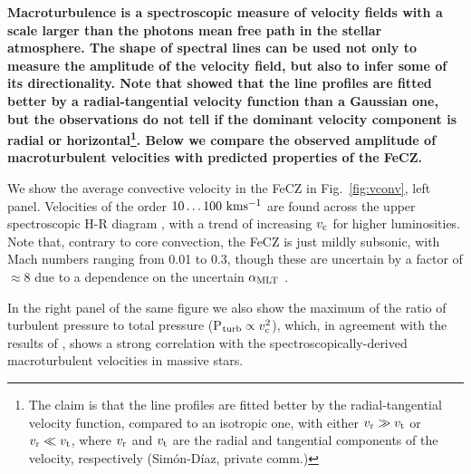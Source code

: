 \documentclass[twocolumn]{aastex63}
\begin{document}
{\bf Macroturbulence is a spectroscopic measure of  velocity fields with a scale larger than the photons mean free path in the stellar atmosphere. The shape of  spectral lines can be used not only to measure the amplitude of the velocity field, but also to infer some of its directionality.  
Note that \citet{Simon-Diaz:2014} showed that the line profiles are fitted better by a radial-tangential velocity function  than a Gaussian one, but the observations do not tell if the dominant velocity component is radial or horizontal\footnote{The claim is that the line profiles are fitted better by the radial-tangential velocity function, compared to an isotropic one, with either $v_{\rm r} \gg v_{\rm t}$ or $v_{\rm r} \ll v_{\rm t}$, where $v_{\rm r}$ and $v_{\rm t}$ are the radial and  tangential  components of the velocity, respectively (Sim\'on-D\'iaz, private comm.)}. 
Below we compare the observed amplitude of macroturbulent velocities with predicted properties of the FeCZ.} 



We show the average convective velocity in the FeCZ in Fig.~\ref{fig:vconv}, left panel. Velocities of the order $10 \dots 100\ \rm km s^{-1}$ are found across the upper spectroscopic H-R diagram \citep[$\mathscr{L} \equiv {\rm T}^4_{\rm eff}/g$;][]{2014A&A...564A..52L}, with a trend of increasing $v_{\rm c}$ for higher luminosities. Note that, contrary to core convection, the FeCZ is just mildly subsonic, with Mach numbers ranging from 0.01 to 0.3, though these are uncertain by a factor of $\approx 8$ due to a dependence on the uncertain $\alpha_{\rm MLT}$ \citep{Cantiello:2019}. 

In the right panel of the same figure we also show the maximum of the ratio of turbulent pressure to total pressure (P$_{\rm turb} \propto v_{\rm c}^2$),  which, in agreement with the results of \citet{Grassitelli:2015}, shows a strong correlation with the spectroscopically-derived macroturbulent velocities in massive stars. 
\end{document}

